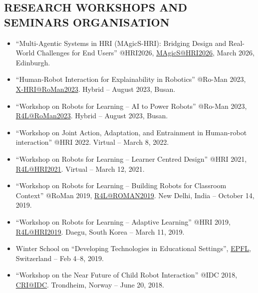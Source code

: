 
\subsection{RESEARCH WORKSHOPS AND SEMINARS ORGANISATION}
\vspace{2pt}

\begin{itemize}
\item ``Multi-Agentic Systems in HRI (MAgicS-HRI): Bridging Design and Real-World Challenges for End Users'' @HRI2026,
\href{https://sites.google.com/view/magics-hri/home}{MAgicS@HRI2026}, March 2026, Edinburgh.
    \item ``Human-Robot Interaction for Explainability in Robotics'' @Ro-Man 2023, \href{https://sites.google.com/view/x-hri/all-workshops/roman2023?authuser=0}{X-HRI@RoMan2023}. Hybrid -- August 2023, Busan.
    \item ``Workshop on Robots for Learning -- AI to Power Robots'' @Ro-Man 2023, \href{https://robots4learning.wordpress.com/r4lroman2023/}{R4L@RoMan2023}. Hybrid -- August 2023, Busan.
    \item ``Workshop on Joint Action, Adaptation, and Entrainment in Human-robot interaction'' @HRI 2022. Virtual -- March 8, 2022.
    \item ``Workshop on Robots for Learning -- Learner Centred Design'' @HRI 2021, \href{https://robot4learning.github.io/event/hri2021/}{R4L@HRI2021}. Virtual -- March 12, 2021.
    \item ``Workshop on Robots for Learning -- Building Robots for Classroom Context'' @RoMan 2019, \href{https://robots4learning.wordpress.com/r4lroman2019/}{R4L@ROMAN2019}. New Delhi, India -- October 14, 2019.
    \item ``Workshop on Robots for Learning -- Adaptive Learning'' @HRI 2019, \href{http://r4l.epfl.ch/HRI2019}{R4L@HRI2019}. Daegu, South Korea -- March 11, 2019.
    \item Winter School on ``Developing Technologies in Educational Settings'', \href{https://www.epfl.ch/labs/chili/index-html/research/animatas/digital-learning-ws/}{EPFL}, Switzerland -- Feb 4--8, 2019.
    \item ``Workshop on the Near Future of Child Robot Interaction'' @IDC 2018, \href{https://sites.google.com/view/cri-idc-workshop}{CRI@IDC}. Trondheim, Norway -- June 20, 2018.

\end{itemize}
